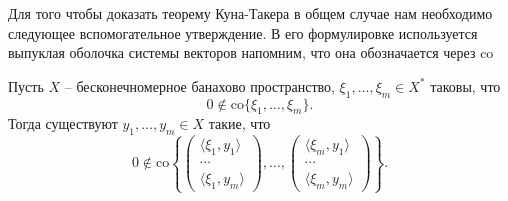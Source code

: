 \documentclass[a4paper,12pt]{report}
\begin{document}
Для того чтобы доказать теорему Куна-Такера в общем случае нам необходимо следующее вспомогательное утверждение. В его формулировке используется выпуклая оболочка системы векторов напомним, что она обозначается через $\mathrm{co}$
\begin{lemma}\label{lm:banach} Пусть $X$ -- бесконечномерное банахово пространство, $\xi_1,\ldots,\xi_m\in X^*$ таковы, что
	$$0\notin\mathrm{co}\{\xi_1,\ldots,\xi_m\}. $$ Тогда существуют $y_1,\ldots,y_m\in X$ такие, что
	$$0\notin\mathrm{co}\left\{\left(\begin{array}{c}\langle \xi_1,y_1\rangle \\ \cdots \\\langle \xi_1,y_m\rangle\end{array}\right),\ldots,\left(\begin{array}{c}\langle \xi_m,y_1\rangle \\ \cdots \\\langle \xi_m,y_m\rangle\end{array}\right)\right\}. $$
\end{lemma}
\end{document}
